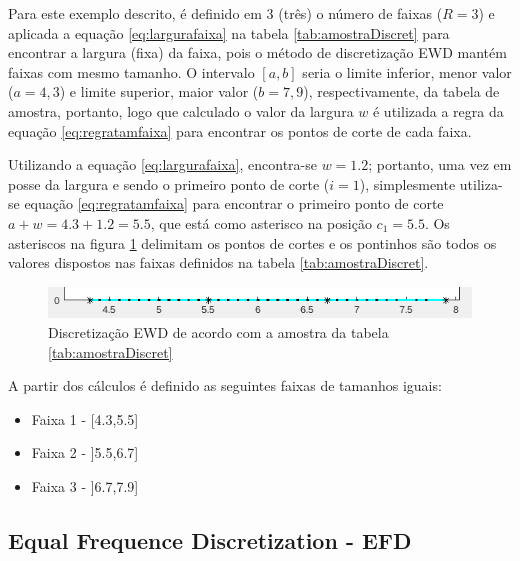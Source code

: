 Para este exemplo descrito, é definido em 3 (três) o número de faixas (${R=3}$) e aplicada a equação \ref{eq:largurafaixa} na tabela \ref{tab:amostraDiscret} para encontrar a largura (fixa) da faixa, pois o método de discretização EWD mantém faixas com mesmo tamanho. O intervalo ${[a,b]}$ seria o limite inferior, menor valor (${a=4,3}$) e limite superior, maior valor (${b=7,9}$), respectivamente, da tabela de amostra, portanto, logo que calculado o valor da largura ${w}$ é utilizada a regra da equação \ref{eq:regratamfaixa} para encontrar os pontos de corte de cada faixa.

Utilizando a equação \ref{eq:largurafaixa}, encontra-se ${w=1.2}$; portanto, uma vez em posse da largura e sendo o primeiro ponto de corte (${i=1}$), simplesmente utiliza-se equação \ref{eq:regratamfaixa} para encontrar o primeiro ponto de corte ${a+w = 4.3 + 1.2 = 5.5}$, que está como asterisco na posição ${c_1=5.5}$. Os asteriscos na figura \ref{fig:faixasFihseririsExemploEWD} delimitam os pontos de cortes e os pontinhos são todos os valores dispostos nas faixas definidos na tabela \ref{tab:amostraDiscret}.

\begin{figure}[h] 
        \centering
        \includegraphics[scale=0.8]{figs/ewd_fisheriris_col1.png}
        \caption{Discretização EWD de acordo com a amostra da tabela \ref{tab:amostraDiscret}}%
        \label{fig:faixasFihseririsExemploEWD}
\end{figure}

A partir dos cálculos é definido as seguintes faixas de tamanhos iguais:
\begin{itemize}[noitemsep]
 \item Faixa 1 - [4.3,5.5]
 \item Faixa 2 - ]5.5,6.7]
 \item Faixa 3 - ]6.7,7.9]
\end{itemize}


\subsection{Equal Frequence Discretization - EFD}\label{cap:refTeor:subsec:efd}

